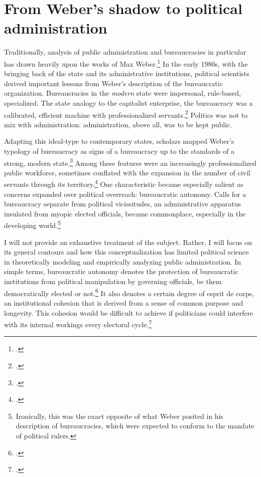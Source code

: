 \documentclass[12pt,]{book}
\let\rmarkdownfootnote\footnote%
\def\footnote{\protect\rmarkdownfootnote}
\begin{document}
\hypertarget{from-webers-shadow-to-political-administration}{%
\section{From Weber's shadow to political administration}\label{from-webers-shadow-to-political-administration}}

Traditionally, analysis of public administration and bureaucracies in particular has drawn heavily upon the works of Max Weber.\footnote{\citet{weber_max_2009}.} In the early 1980s, with the bringing back of the state and its administrative institutions, political scientists derived important lessons from Weber's description of the bureaucratic organization. Bureaucracies in the \emph{modern} state were impersonal, rule-based, specialized. The state analogy to the capitalist enterprise, the bureaucracy was a calibrated, efficient machine with professionalized servants.\footnote{\citet{weber_max_2009}.} Politics was not to mix with administration: administration, above all, was to be kept public.

Adapting this ideal-type to contemporary states, scholars mapped Weber's typology of bureaucracy as signs of a bureaucracy up to the standards of a strong, modern state.\footnote{\citet{skocpol_bringing_1985}.} Among these features were an increasingly professionalized public workforce, sometimes conflated with the expansion in the number of civil servants through its territory.\footnote{\citet{mann_autonomous_1984}.} One characteristic became especially salient as concerns expanded over political overreach: bureaucratic autonomy. Calls for a bureaucracy separate from political vicissitudes, an administrative apparatus insulated from myopic elected officials, became commonplace, especially in the developing world.\footnote{Ironically, this was the exact opposite of what Weber posited in his description of bureaucracies, which were expected to conform to the mandate of political rulers.}

I will not provide an exhaustive treatment of the subject. Rather, I will focus on its general contours and how this conceptualization has limited political science in theoretically modeling and empirically analyzing public administration. In simple terms, bureaucratic autonomy denotes the protection of bureaucratic institutions from political manipulation by governing officials, be them democratically elected or not.\footnote{\citet{evans_embedded_1995}.} It also denotes a certain degree of esprit de corps, an institutional cohesion that is derived from a sense of common purpose and longevity. This cohesion would be difficult to achieve if politicians could interfere with its internal workings every electoral cycle.\footnote{\citet{suleiman_dismantling_2013}.}
\end{document}
